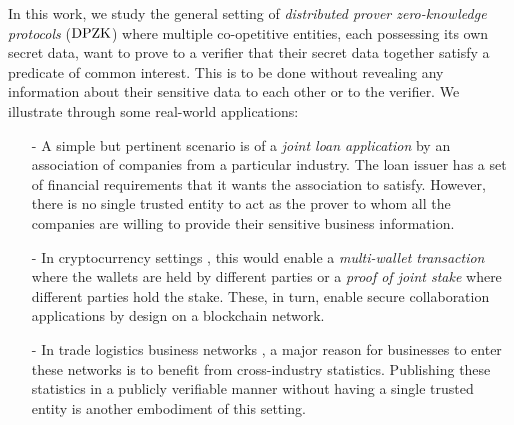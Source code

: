 In this work, we study the general setting of \textit{distributed prover
	zero-knowledge protocols} ($\text{DPZK}$) where multiple co-opetitive entities, each possessing its own secret data, want to prove to a verifier that their secret data together satisfy a predicate of common interest. This is to be done without revealing any information
about their sensitive data to each other or to the verifier. We illustrate
through some real-world applications: %

\begin{itemize}
	\item[-] A simple but pertinent scenario is of a \textit{joint loan application} by an association of companies from a particular industry. The loan issuer has a set of financial requirements that it wants the association to satisfy. However, there is no single trusted entity to act as the prover to whom all the companies are willing to provide their sensitive business information.
	\item[-] In cryptocurrency settings \cite{bitcoin, ethereum, zerocash}, this would enable a \textit{multi-wallet transaction} where the wallets are held by different parties or a \textit{proof of joint stake} where different parties hold the stake. These, in turn, enable secure collaboration applications by design on a blockchain network. %
	\item[-] In trade logistics business networks \cite{scbn, e2open, tradelens}, a major reason for businesses to enter these networks is to benefit from cross-industry statistics. Publishing these statistics in a publicly verifiable manner without having a single trusted entity is another embodiment of this setting.

\end{itemize}

